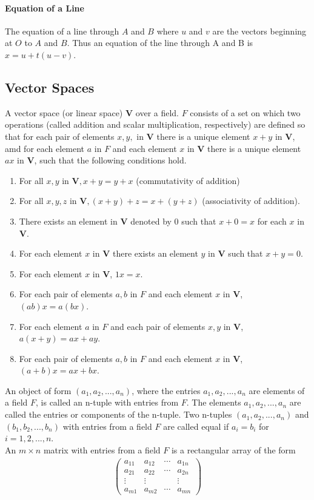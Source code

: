 \documentclass[11pt]{article}
\begin{document}
\paragraph{Equation of a Line}
The equation of a line through $A$ and $B$ where $u$ and $v$ are the vectors beginning at $O$ to $A$ and $B$. Thus an equation of the line through A and B is $x = u + t(u - v)$.
\subsection{Vector Spaces}
A vector space (or linear space) $\textbf{V}$ over a field. $F$ consists of a set on which two operations (called addition and scalar multiplication, respectively) are defined so that for each pair of elements $x, y,$ in $\textbf{V}$ there is a unique element $x + y$ in $\textbf{V}$, amd for each element $a$ in $F$ and each element $x$ in $\textbf{V}$ there is a unique element $ax$ in $\textbf{V}$, such that the following conditions hold.
\begin{enumerate}[label=(VS \arabic*)]   
\setlength{\itemindent}{.25in}      
	\item For all $x, y$ in $\textbf{V}, x + y = y + x$ (commutativity of addition)
	\item For all $x, y, z$ in $\textbf{V}, (x + y) + z = x + (y + z)$ (associativity of addition).
	\item There exists an element in $\textbf{V}$ denoted by $0$ such that $x + 0 = x$ for each $x$ in $\textbf{V}$.
	\item For each element $x$ in $\textbf{V}$ there exists an element $y$ in $\textbf{V}$ such that $x + y = 0$.
	\item For each element $x$ in $\textbf{V}$, $1x = x$.
	\item For each pair of elements $a, b$ in $F$ and each element $x$ in $\textbf{V}$, $(ab)x = a(bx)$.
	\item For each element $a$ in $F$ and each pair of elements $x, y$ in $\textbf{V}$, $a(x + y) = ax + ay$.
	\item For each pair of elements $a, b$ in $F$ and each element $x$ in $\textbf{V}$, $(a + b)x = ax + bx$.
\end{enumerate}
An object of form $(a_1, a_2, ..., a_n)$, where the entries $a_1, a_2, ..., a_n$ are elements of a field $F$, is called an n-tuple with entries from $F$. The elements $a_1, a_2, ..., a_n$ are called the entries or components of the n-tuple. Two n-tuples $(a_1, a_2, ..., a_n)$ and $(b_1, b_2, ..., b_n)$ with entries from a field $F$ are called equal if $a_i = b_i$ for $i = 1, 2, ..., n$.\\
An $m \times n$ matrix with entries from a field $F$ is a rectangular array of the form
\begin{align*}
\left(
\begin{matrix}
a_{11}&a_{12}&\cdots&a_{1n}\\
a_{21}&a_{22}&\cdots&a_{2n}\\
\vdots&\vdots&&\vdots\\
a_{m1}&a_{m2}&\cdots&a_{mn}
\end{matrix}
\right)
\end{align*}
\end{document}
